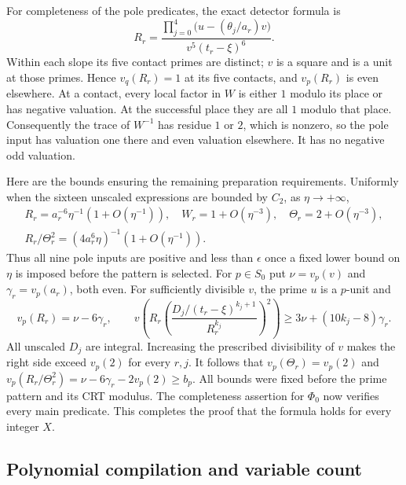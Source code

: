 For completeness of the pole predicates, the exact detector formula is
\[
 R_r=\frac{\prod_{j=0}^4\bigl(u-(\theta_j/a_r)v\bigr)}
                    {v^5(t_r-\xi)^6}.
\]
Within each slope its five contact primes are distinct; $v$ is a square
and is a unit at those primes. Hence $v_q(R_r)=1$ at its five contacts,
and $v_p(R_r)$ is even elsewhere. At a contact, every local factor in
$W$ is either $1$ modulo its place or has negative valuation. At the
successful place they are all $1$ modulo that place. Consequently the
trace of $W^{-1}$ has residue $1$ or $2$, which is nonzero, so the pole
input has valuation one there and even valuation elsewhere. It has no
negative odd valuation.

Here are the bounds ensuring the remaining preparation requirements.
Uniformly when the sixteen unscaled expressions are bounded by $C_2$,
as $\eta\to+\infty$,
\[
 \begin{gathered}
 R_r=a_r^{-6}\eta^{-1}(1+O(\eta^{-1})),\quad
 W_r=1+O(\eta^{-3}),\quad \Theta_r=2+O(\eta^{-3}),\\
 R_r/\Theta_r^2=(4a_r^6\eta)^{-1}(1+O(\eta^{-1})).
 \end{gathered}
\]
Thus all nine pole inputs are positive and less than $\epsilon$ once a
fixed lower bound on $\eta$ is imposed before the pattern is selected.
For $p\in S_0$ put $\nu=v_p(v)$ and $\gamma_r=v_p(a_r)$, both even.
For sufficiently divisible $v$, the prime $u$ is a $p$-unit and
\[
 v_p(R_r)=\nu-6\gamma_r,\qquad
 v\left(R_r\left(\frac{D_j/(t_r-\xi)^{k_j+1}}{R_r^{k_j}}\right)^2\right)
 \ge3\nu+(10k_j-8)\gamma_r.
\]
All unscaled $D_j$ are integral. Increasing the prescribed divisibility
of $v$ makes the right side exceed $v_p(2)$ for every $r,j$.
It follows that $v_p(\Theta_r)=v_p(2)$ and
$v_p(R_r/\Theta_r^2)=\nu-6\gamma_r-2v_p(2)\ge b_p$.
All bounds were fixed before the prime pattern and its CRT modulus.
The completeness assertion for $\Phi_0$ now verifies every main predicate.
This completes the proof that the formula holds for every integer $X$.

\subsection{Polynomial compilation and variable count}

